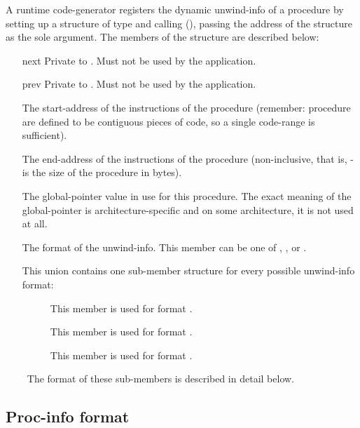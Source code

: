 \documentclass{article}
\begin{document}
A runtime code-generator registers the dynamic unwind-info of a
procedure by setting up a structure of type 
and calling (), passing the address of the
structure as the sole argument.  The members of the
 structure are described below:
\begin{itemize}
\item[\Type{void~*}next] Private to .  Must not be used
  by the application.
\item[\Type{void~*}prev] Private to .  Must not be used
  by the application.
\item[\Type{unw\_word\_t} \Var{start\_ip}] The start-address of the
  instructions of the procedure (remember: procedure are defined to be
  contiguous pieces of code, so a single code-range is sufficient).
\item[\Type{unw\_word\_t} \Var{end\_ip}] The end-address of the
  instructions of the procedure (non-inclusive, that is,
  - is the size of the procedure in
  bytes).
\item[\Type{unw\_word\_t} \Var{gp}] The global-pointer value in use
  for this procedure.  The exact meaning of the global-pointer is
  architecture-specific and on some architecture, it is not used at
  all.
\item[\Type{int32\_t} \Var{format}] The format of the unwind-info.
  This member can be one of ,
  , or
  .
\item[\Type{union} \Var{u}] This union contains one sub-member
  structure for every possible unwind-info format:
  \begin{description}
  \item[ ] This member is used
    for format .
  \item[ ] This member is used
    for format .
  \item[ ] This member
    is used for format .
  \end{description}\
  The format of these sub-members is described in detail below.
\end{itemize}

\subsection{Proc-info format}
\end{document}
